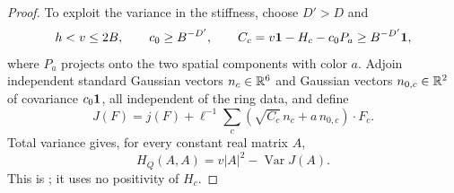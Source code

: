 \begin{proof}
To exploit the variance in the stiffness, choose $D'>D$ and
\[
 h<v\le2B,\qquad c_0\ge B^{-D'},\qquad
 C_c=v\mathbf 1-H_c-c_0P_a\ge B^{-D'}\mathbf 1,
\]
where $P_a$ projects onto the two spatial components with color $a$.
Adjoin independent standard Gaussian vectors $n_c\in\mathbb R^6$ and
Gaussian vectors $n_{0,c}\in\mathbb R^2$ of covariance $c_0\mathbf 1$, all independent
of the ring data, and define
\begin{equation}
 J(F)=j(F)+\ell^{-1}\sum_c
       (\sqrt{C_c}\,n_c+a\,n_{0,c})\cdot F_c.
 \label{eq:prelim-augmented-current}
\end{equation}
Total variance gives, for every constant real matrix $A$,
\begin{equation}
 H_Q(A,A)=v|A|^2-\operatorname{Var}J(A).
 \label{eq:prelim-variance-identity}
\end{equation}
This is ; it uses no positivity of $H_c$.


\end{proof}
